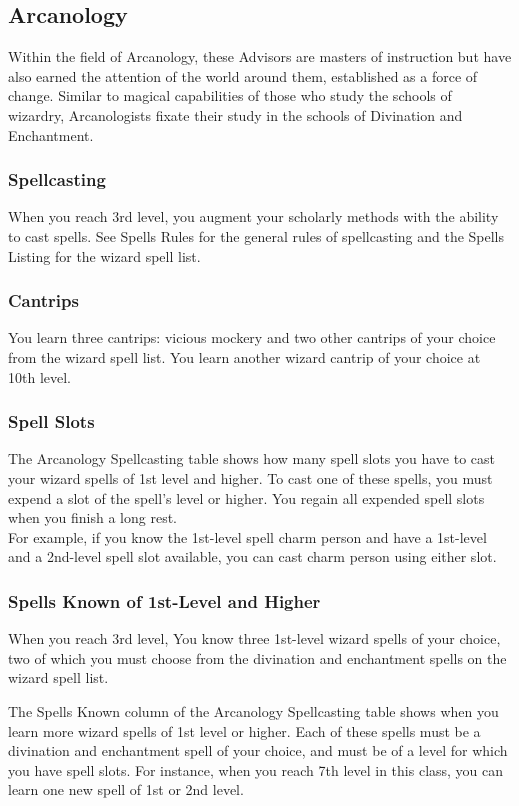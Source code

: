\documentclass[letterpaper,openany,twoside,twocolumn]{book}
\begin{document}
	\subsection*{Arcanology}
	Within the field of Arcanology, these Advisors are masters of instruction but have also earned the attention of the world around them, established as a force of change. Similar to magical capabilities of those who study the schools of wizardry, Arcanologists fixate their study in the schools of Divination and Enchantment.
	
	\subsubsection*{Spellcasting}
	When you reach 3rd level, you augment your scholarly methods with the ability to cast spells. See Spells Rules for the general rules of spellcasting and the Spells Listing for the wizard spell list.
	
	\subsubsection*{Cantrips}
	You learn three cantrips: vicious mockery and two other cantrips of your choice from the wizard spell list. You learn another wizard cantrip of your choice at 10th level.
	
	\subsubsection*{Spell Slots}
	The Arcanology Spellcasting table shows how many spell slots you have to cast your wizard spells of 1st level and higher. To cast one of these spells, you must expend a slot of the spell’s level or higher. You regain all expended spell slots when you finish a long rest.\\
	For example, if you know the 1st-level spell charm person and have a 1st-level and a 2nd-level spell slot available, you can cast charm person using either slot.

	\subsubsection*{Spells Known of 1st-Level and Higher}
	When you reach 3rd level, You know three 1st-level wizard spells of your choice, two of which you must choose from the divination and enchantment spells on the wizard spell list.
	
	The Spells Known column of the Arcanology Spellcasting table shows when you learn more wizard spells of 1st level or higher. Each of these spells must be a divination and enchantment spell of your choice, and must be of a level for which you have spell slots. For instance, when you reach 7th level in this class, you can learn one new spell of 1st or 2nd level.
	
\end{document}

